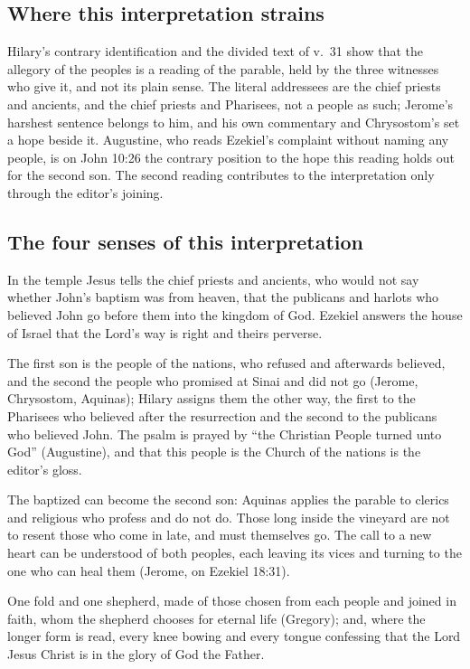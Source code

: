 \subsection{Where this interpretation strains}

Hilary's contrary identification and the divided text of v.~31 show that the
allegory of the peoples is a reading of the parable, held by the three
witnesses who give it, and not its plain sense. The literal addressees are the
chief priests and ancients, and the chief priests and Pharisees, not a people
as such; Jerome's harshest sentence belongs to him, and his own commentary and
Chrysostom's set a hope beside it. Augustine, who reads Ezekiel's complaint
without naming any people, is on John 10:26 the contrary position to the hope
this reading holds out for the second son. The second reading contributes to
the interpretation only through the editor's joining.

\subsection{The four senses of this interpretation}

\begin{fourSenses}
\item[Literal.] In the temple Jesus tells the chief priests and ancients, who
would not say whether John's baptism was from heaven, that the publicans and
harlots who believed John go before them into the kingdom of God. Ezekiel
answers the house of Israel that the Lord's way is right and theirs perverse.

\item[Allegorical.] The first son is the people of the nations, who refused and
afterwards believed, and the second the people who promised at Sinai and did
not go (Jerome, Chrysostom, Aquinas); Hilary assigns them the other way, the
first to the Pharisees who believed after the resurrection and the second to
the publicans who believed John. The psalm is prayed by ``the Christian People
turned unto God'' (Augustine), and that this people is the Church of the
nations is the editor's gloss.

\item[Moral.] The baptized can become the second son: Aquinas applies the
parable to clerics and religious who profess and do not do. Those long inside
the vineyard are not to resent those who come in late, and must themselves go.
The call to a new heart can be understood of both peoples, each leaving its
vices and turning to the one who can heal them (Jerome, on Ezekiel 18:31).

\item[Anagogical.] One fold and one shepherd, made of those chosen from each
people and joined in faith, whom the shepherd chooses for eternal life
(Gregory); and, where the longer form is read, every knee bowing and every
tongue confessing that the Lord Jesus Christ is in the glory of God the
Father.
\end{fourSenses}
